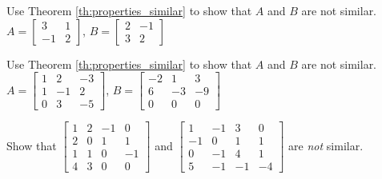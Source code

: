 \documentclass{ximera}
\begin{document}
\begin{problem}\label{prob:notsimilar_c}
  Use Theorem \ref{th:properties_similar} to show that $A$ and $B$ are not similar.
$A =
\begin{bmatrix}
3 & 1 \\
-1 & 2
\end{bmatrix}$, $B =
\begin{bmatrix}
2 & -1 \\
3 & 2
\end{bmatrix}$
\end{problem}



\begin{problem}\label{prob:notsimilar_e}
  Use Theorem \ref{th:properties_similar} to show that $A$ and $B$ are not similar.
$A =
\begin{bmatrix}
1 & 2 & -3 \\
1 & -1 & 2 \\
0 & 3 & -5
\end{bmatrix}$, $B =
\begin{bmatrix}
-2 & 1 & 3 \\
 6 & -3 & -9 \\
 0 & 0 & 0
\end{bmatrix}$
\end{problem}







\begin{problem}\label{prob:notsimilar_4x4}

Show that $\begin{bmatrix}
1 & 2 & -1 &  0 \\
2 & 0 &  1 &  1 \\
1 & 1 &  0 & -1 \\
4 & 3 & 0 & 0
\end{bmatrix}$ and $
\begin{bmatrix}
  1 & -1 &  3 &  0 \\
 -1 &  0 &  1 &  1 \\
  0 & -1 &  4 &  1 \\
  5 & -1 & -1 & -4
\end{bmatrix}$ are \textit{not} similar.
\end{problem}
\end{document}
